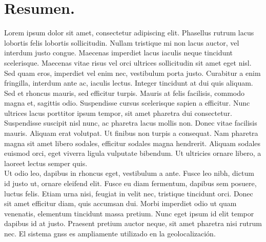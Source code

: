 \chapter*{Resumen.}

\begin{justify}

    Lorem ipsum dolor sit amet, consectetur adipiscing elit.
    Phasellus rutrum lacus lobortis felis lobortis sollicitudin. Nullam tristique mi non lacus auctor, vel interdum justo congue.
    Maecenas imperdiet lacus iaculis neque tincidunt scelerisque. Maecenas vitae risus vel orci ultrices sollicitudin sit amet eget nisl.
    Sed quam eros, imperdiet vel enim nec, vestibulum porta justo. Curabitur a enim fringilla, interdum ante ac, iaculis lectus.
    Integer tincidunt at dui quis aliquam.\\

    \noindent Sed et rhoncus mauris, sed efficitur turpis.
    Mauris at felis facilisis, commodo magna et, sagittis odio. Suspendisse cursus scelerisque sapien a efficitur.
    Nunc ultrices lacus porttitor ipsum tempor, sit amet pharetra dui consectetur.
    Suspendisse suscipit nisl nunc, ac pharetra lacus mollis non. Donec vitae facilisis mauris.
    Aliquam erat volutpat. Ut finibus non turpis a consequat. Nam pharetra magna sit amet libero sodales, efficitur sodales magna hendrerit.
    Aliquam sodales euismod orci, eget viverra ligula vulputate bibendum. Ut ultricies ornare libero, a laoreet lectus semper quis.\\
    
    \noindent Ut odio leo, dapibus in rhoncus eget, vestibulum a ante.
    Fusce leo nibh, dictum id justo ut, ornare eleifend elit. Fusce eu diam fermentum, dapibus sem posuere, luctus felis.
    Etiam urna nisi, feugiat in velit nec, tristique tincidunt orci. Donec sit amet efficitur diam, quis accumsan dui.
    Morbi imperdiet odio ut quam venenatis, elementum tincidunt massa pretium. Nunc eget ipsum id elit tempor dapibus id at justo.
    Praesent pretium auctor neque, sit amet pharetra nisi rutrum nec. El sistema \gls{gnss} es ampliamente utilizado en la geolocalización.

\end{justify}